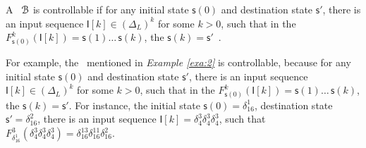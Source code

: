 \begin{definition}[Controllability]
	A \BCN\ ${\mathcal{B}}$ is controllable if for any initial state $\mathsf{s}(0)$ and destination state $\mathsf{s}'$, there is an input sequence $\mathsf{I}[k]\in(\Delta_L)^k$ for some $k>0$, such that in the $F^k_{\mathsf{s}(0)}(\mathsf{I}[k])=\mathsf{s}(1) \ldots\, \mathsf{s}(k)$, the $\mathsf{s}(k)=\mathsf{s}'$~\cite{cheng2009controllability}.
\end{definition}

\begin{example}
For example, the \BCN\ mentioned in {\em Example \ref{exa:2}} is controllable, because for any initial state $\mathsf{s}(0)$ and destination state $\mathsf{s}'$, there is an input sequence $\mathsf{I}[k]\in(\Delta_L)^k$ for some $k>0$, such that in the $F^k_{\mathsf{s}(0)}(\mathsf{I}[k])=\mathsf{s}(1) \ldots\, \mathsf{s}(k)$, the $\mathsf{s}(k)=\mathsf{s}'$. For instance, the initial state $\mathsf{s}(0)= \delta_{16}^{1}$, destination state $\mathsf{s}'=\delta_{16}^{2}$, there is an input sequence $\mathsf{I}[k]=\delta_{4}^{3}\delta_{4}^{3}\delta_{4}^{3}$, such that $F^3_{\delta_{16}^{1}}(\delta_{4}^{3}\delta_{4}^{3}\delta_{4}^{3})=\delta_{16}^{13}\delta_{16}^{11}\delta_{16}^{2}$.
\label{exa:12}
\end{example}  



